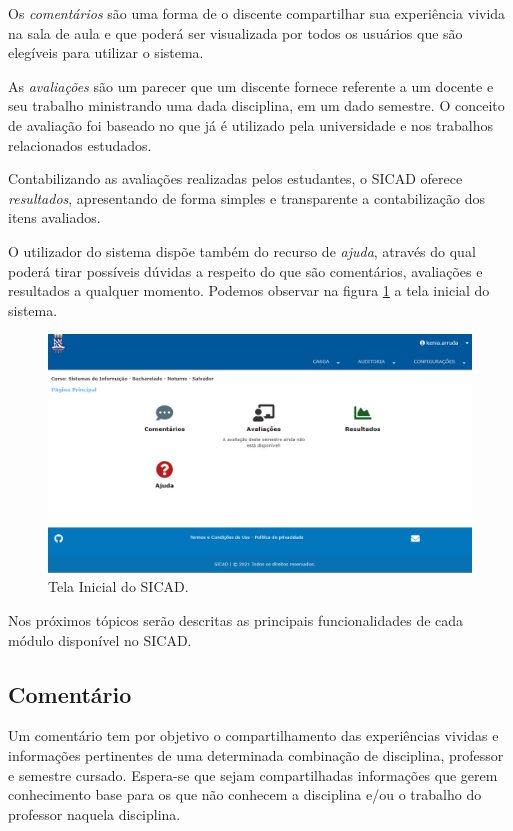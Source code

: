 \documentclass[12pt, a4paper]{report}
\begin{document}
Os \textit{comentários} são uma forma de o discente compartilhar sua experiência vivida na sala de aula e que poderá ser visualizada por todos os usuários que são elegíveis para utilizar o sistema.

As \textit{avaliações} são um parecer que um discente fornece referente a um docente e seu trabalho ministrando uma dada disciplina, em um dado semestre. O conceito de avaliação foi baseado no que já é utilizado pela universidade e nos trabalhos relacionados estudados.

Contabilizando as avaliações realizadas pelos estudantes, o \ac{SICAD} oferece \textit{resultados}, apresentando de forma simples e transparente a contabilização dos itens avaliados.

O utilizador do sistema dispõe também do recurso de \textit{ajuda}, através do qual poderá tirar possíveis dúvidas a respeito do que são comentários, avaliações e resultados a qualquer momento. Podemos observar na figura \ref{fig:home_administrador} a tela inicial do sistema.
\begin{figure}
\centering
\includegraphics[scale=0.5]{home_administrador2.png}
\caption{Tela Inicial do SICAD.}
\label{fig:home_administrador}
\end{figure}

Nos próximos tópicos serão descritas as principais funcionalidades de cada módulo disponível no \ac{SICAD}.

\subsection{Comentário}
\label{subsec:comentario}
Um comentário tem por objetivo o compartilhamento das experiências vividas e informações pertinentes de uma determinada combinação de disciplina, professor e semestre cursado. Espera-se que sejam compartilhadas informações que gerem conhecimento base para os que não conhecem a disciplina e/ou o trabalho do professor naquela disciplina.
\end{document}
